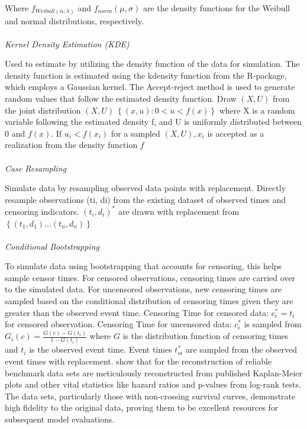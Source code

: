 \noindent Where \(f_{Weibull(\alpha, \lambda)}\) and \(f_{norm}(\mu,\sigma)\) are the density functions for the Weibull and normal distributions, respectively.
\\\\
\textit{Kernel Density Estimation (KDE)}
\par \noindent Used to estimate by utilizing the density function of the data for simulation. The density function is estimated using the kdensity function from the \parencite{thurow_how_2023} R-package, which employs a Gaussian kernel. The Accept-reject method is used to generate random values that follow the estimated density function. Draw \((X, U)\) from the joint distribution \((X, U) ~ \left\{ (x,u):0<u<f(x)\right\}\) where X is a random variable following the estimated density f, and U is uniformly distributed between 0 and \(f(x)\). If \(u_{i} < f(x_{i})\) for a sampled \((X,U),x_{i}\) is accepted as a realization from the density function \(f\)
\\\\
\textit{Case Resampling}
\par \noindent Simulate data by resampling observed data points with replacement. Directly resample observations (ti, di) from the existing dataset of observed times and censoring indicators. \((t_{i}, d_{i})^{*}\) are drawn with replacement from \(\left\{ (t_{1}, d_{1}) \dots (t_{n}, d_{n})\right\}\)
\\\\
\textit{Conditional Bootstrapping}
\par \noindent To simulate data using bootstrapping that accounts for censoring, this helps sample censor times. For censored observations, censoring times are carried over to the simulated data. For uncensored observations, new censoring times are sampled based on the conditional distribution of censoring times given they are greater than the observed event time. Censoring Time for censored data: \(c_{i}^{*} = t_{i}\) for censored observation. Censoring Time for uncensored data: \(c_{i}^{*}\) is sampled from \(G_{i}(c) = \frac{G(c)-G(t_{i})}{1-G(t_{i})}\) where \(G\) is the distribution function of censoring times and \(t_{i}\) is the observed event time. Event times \(t^{*}_{oi}\) are sampled from the observed event times with replacement. \parencite{thurow_how_2023} show that for the reconstruction of reliable benchmark data sets are meticulously reconstructed from published Kaplan-Meier plots and other vital statistics like hazard ratios and p-values from log-rank tests. The data sets, particularly those with non-crossing survival curves, demonstrate high fidelity to the original data, proving them to be excellent resources for subsequent model evaluations.

